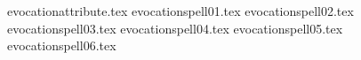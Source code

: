 

\tablelabels
{evocationattribute.tex}%
\spellrule
{evocationspell01.tex}%
\spellrule
{evocationspell02.tex}%
\spellrule
{evocationspell03.tex}%
\spellrule
{evocationspell04.tex}%
\spellrule
{evocationspell05.tex}%
\spellrule
{evocationspell06.tex}%
\closetable{}
